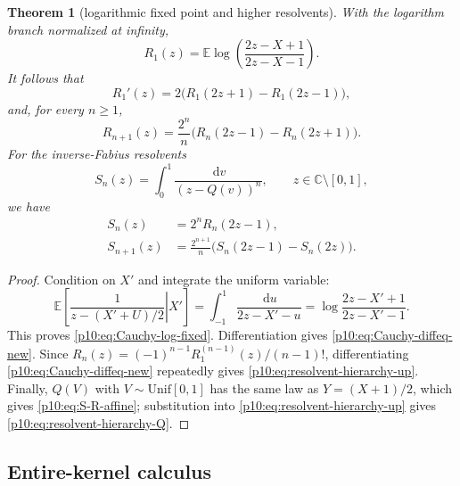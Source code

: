\documentclass[11pt,oneside]{article}
\newtheorem{theorem}{Theorem}[section]
\theoremstyle{definition}
\theoremstyle{remark}
\newcommand{\Q}{Q}
\newcommand{\E}{\mathbb E}
\newcommand{\C}{\mathbb C}
\newcommand{\dd}{\,\mathrm d}
\newcommand{\1}{\mathbf 1}
\begin{document}
\begin{theorem}[logarithmic fixed point and higher resolvents]
\label{p10:thm:Cauchy-fixed-hierarchy}
With the logarithm branch normalized at infinity,
\begin{equation}\label{p10:eq:Cauchy-log-fixed}
 \boxed{
 R_1(z)=\E\log\!\left(\frac{2z-X+1}{2z-X-1}\right).}
\end{equation}
It follows that
\begin{equation}\label{p10:eq:Cauchy-diffeq-new}
 R_1'(z)=2\bigl(R_1(2z+1)-R_1(2z-1)\bigr),
\end{equation}
and, for every \(n\ge1\),
\begin{equation}\label{p10:eq:resolvent-hierarchy-up}
 \boxed{
 R_{n+1}(z)
 =\frac{2^n}{n}\bigl(R_n(2z-1)-R_n(2z+1)\bigr).}
\end{equation}
For the inverse-Fabius resolvents
\begin{equation}\label{p10:eq:Sn-def}
 S_n(z)=\int_0^1\frac{\dd v}{(z-\Q(v))^n},
 \qquad z\in\C\setminus[0,1],
\end{equation}
we have
\begin{align}
 S_n(z)&=2^nR_n(2z-1),
 \label{p10:eq:S-R-affine}\\
 S_{n+1}(z)
 &=\frac{2^{n+1}}n\bigl(S_n(2z-1)-S_n(2z)\bigr).
 \label{p10:eq:resolvent-hierarchy-Q}
\end{align}
\end{theorem}

\begin{proof}
Condition on \(X'\) and integrate the uniform variable:
\[
 \E\left[\left.\frac1{z-(X'+U)/2}\right|X'\right]
 =\int_{-1}^1\frac{\dd u}{2z-X'-u}
 =\log\frac{2z-X'+1}{2z-X'-1}.
\]
This proves \eqref{p10:eq:Cauchy-log-fixed}.  Differentiation gives
\eqref{p10:eq:Cauchy-diffeq-new}.  Since
\(
 R_n(z)=(-1)^{n-1}R_1^{(n-1)}(z)/(n-1)!
\), differentiating \eqref{p10:eq:Cauchy-diffeq-new} repeatedly gives
\eqref{p10:eq:resolvent-hierarchy-up}.  Finally, \(\Q(V)\) with
\(V\sim\mathrm{Unif}[0,1]\) has the same law as \(Y=(X+1)/2\), which gives
\eqref{p10:eq:S-R-affine}; substitution into \eqref{p10:eq:resolvent-hierarchy-up} gives
\eqref{p10:eq:resolvent-hierarchy-Q}.
\end{proof}


\subsection{Entire-kernel calculus}
\end{document}

